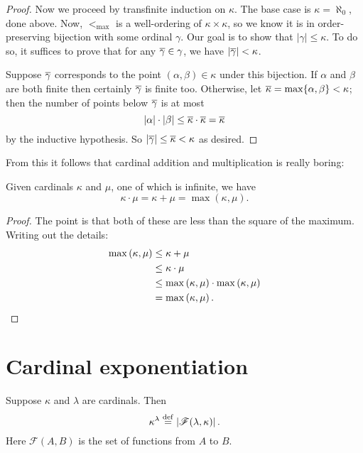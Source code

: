 \begin{proof}
	Now we proceed by transfinite induction on $\kappa$.
	The base case is $\kappa = \aleph_0$, done above.
	Now, $<_{\text{max}}$ is a well-ordering of $\kappa \times \kappa$,
	so we know it is in order-preserving bijection with some ordinal $\gamma$.
	Our goal is to show that $\left\lvert \gamma \right\rvert \le \kappa$.
	To do so, it suffices to prove that for any $\overline\gamma \in \gamma$,
	we have $\left\lvert \overline\gamma \right\rvert < \kappa$.

	Suppose $\overline\gamma$ corresponds to the point $(\alpha, \beta) \in \kappa$
	under this bijection.
	If $\alpha$ and $\beta$ are both finite
	then certainly $\overline\gamma$ is finite too.
	Otherwise, let $\overline\kappa = \max \{\alpha, \beta\} < \kappa$;
	then the number of points below $\overline\gamma$ is at most
	\[ 
		\left\lvert \alpha \right\rvert \cdot \left\lvert \beta \right\rvert
		\le \overline\kappa \cdot \overline\kappa
		= \overline\kappa
	\]
	by the inductive hypothesis.
	So $\left\lvert \overline\gamma \right\rvert \le \overline\kappa < \kappa$ as desired.
\end{proof}

From this it follows that cardinal addition and multiplication is really boring:
\begin{theorem}
	Given cardinals $\kappa$ and $\mu$, one of which is infinite,
	we have \[ \kappa \cdot \mu = \kappa + \mu = \max\left( \kappa, \mu \right).\]
\end{theorem}
\begin{proof}
	The point is that both of these are less than the square of the maximum.
	Writing out the details:
	\begin{align*}
		\max \left( \kappa, \mu \right)
		&\le \kappa + \mu \\ 
		&\le \kappa \cdot \mu \\ 
		&\le \max \left( \kappa, \mu \right) \cdot \max \left( \kappa, \mu  \right) \\
		&= \max\left( \kappa, \mu \right). \qedhere
	\end{align*}
\end{proof}




\section{Cardinal exponentiation}
\begin{definition}
	Suppose $\kappa$ and $\lambda$ are cardinals.
	Then
	\[ \kappa^\lambda
		\overset{\mathrm{def}}{=} \left\lvert \mathscr F(\lambda, \kappa) \right\rvert.
	\]
	Here $\mathscr F(A,B)$ is the set of functions from $A$ to $B$.
\end{definition}

